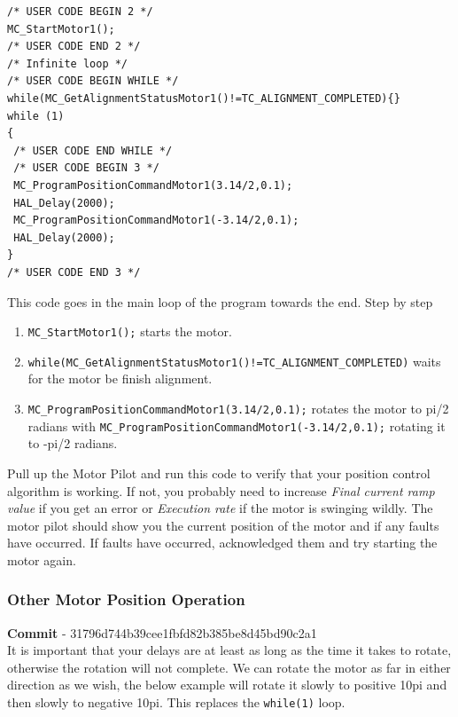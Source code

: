 \documentclass[10pt]{article}
\begin{document}
                \begin{verbatim}
/* USER CODE BEGIN 2 */
MC_StartMotor1();
/* USER CODE END 2 */
/* Infinite loop */
/* USER CODE BEGIN WHILE */
while(MC_GetAlignmentStatusMotor1()!=TC_ALIGNMENT_COMPLETED){}
while (1)
{
 /* USER CODE END WHILE */
 /* USER CODE BEGIN 3 */
 MC_ProgramPositionCommandMotor1(3.14/2,0.1);
 HAL_Delay(2000);
 MC_ProgramPositionCommandMotor1(-3.14/2,0.1);
 HAL_Delay(2000);
}
/* USER CODE END 3 */
                \end{verbatim}
                This code goes in the main loop of the program towards the end. Step by step 
                \begin{enumerate}
                    \item \texttt{MC\_StartMotor1();} starts the motor.
                    \item \texttt{while(MC\_GetAlignmentStatusMotor1()!=TC\_ALIGNMENT\_COMPLETED){}} waits for the motor be finish alignment.
                    \item \texttt{MC\_ProgramPositionCommandMotor1(3.14/2,0.1);} rotates the motor to pi/2 radians with \texttt{MC\_ProgramPositionCommandMotor1(-3.14/2,0.1);} rotating it to -pi/2 radians.
                \end{enumerate}
                Pull up the Motor Pilot and run this code to verify that your position control algorithm is working. If not, you probably need to increase \emph{Final current ramp value} if you get an error or \emph{Execution rate} if the motor is swinging wildly. The motor pilot should show you the current position of the motor and if any faults have occurred. If faults have occurred, acknowledged them and try starting the motor again.
			\FloatBarrier \subsubsection{Other Motor Position Operation}
                \textbf{Commit} - 31796d744b39cee1fbfd82b385be8d45bd90c2a1 \\
                It is important that your delays are at least as long as the time it takes to rotate, otherwise the rotation will not complete. We can rotate the motor as far in either direction as we wish, the below example will rotate it slowly to positive 10pi and then slowly to negative 10pi. This replaces the \texttt{while(1)} loop.
\end{document}
